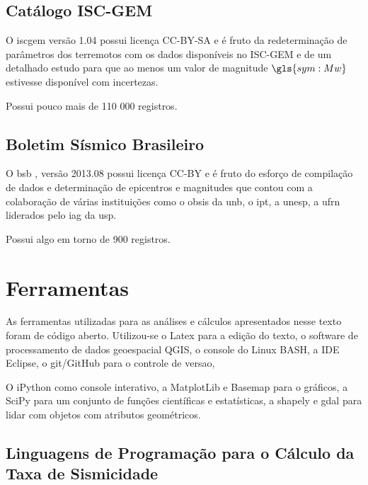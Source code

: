 \subsection{Catálogo ISC-GEM}
\label{sec:data_source}

O \glsdesc{iscgem} versão 1.04 possui licença CC-BY-SA e é fruto da redeterminação de parâmetros
dos terremotos com os dados disponíveis no ISC-GEM e de um detalhado estudo para que ao menos um valor de
magnitude $\gls{sym:Mw}$ estivesse disponível com incertezas.

Possui pouco mais de 110 000 registros.  

\subsection{Boletim Sísmico Brasileiro}
\label{sec:data_source2}

O \glsdesc{bsb} \citep{bsb_2013}, versão 2013.08 possui licença CC-BY e é fruto do esforço de compilação de
dados e determinação de epicentros e magnitudes que contou com a colaboração de várias instituições
como o \gls{obsis} da \gls{unb}, o \gls{ipt}, a \gls{unesp}, a \gls{ufrn} liderados pelo \gls{iag} da \gls{usp}.


Possui algo em torno de 900 registros.


\section{Ferramentas}
\label{sec:ferramentas}

As ferramentas utilizadas para as análises e cálculos apresentados nesse texto
foram de código aberto.
Utilizou-se o Latex para a edição do texto, o software de processamento de dados
geoespacial QGIS, o console do Linux BASH, a IDE Eclipse, o git/GitHub para o controle de versao,

O iPython como console interativo, a MatplotLib e Basemap para o gráficos, 
a SciPy para um conjunto de funções científicas e estatísticas, a shapely e gdal
para lidar com objetos com atributos geométricos.


\subsection{Linguagens de Programação para o Cálculo da Taxa de Sismicidade}
\label{sec:linguagens}

